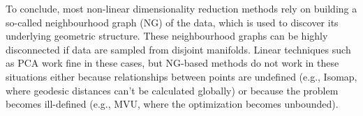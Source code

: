 
    


    To conclude, most non-linear dimensionality reduction methods rely on building a so-called neighbourhood graph (NG) of the data, which is used to discover its underlying geometric structure. These neighbourhood graphs can be highly disconnected if data are sampled from disjoint manifolds. Linear techniques such as PCA work fine in these cases, but NG-based methods do not work in these situations either because relationships between points are undefined (e.g., Isomap, where geodesic distances can't be calculated globally) or because the problem becomes ill-defined (e.g., MVU, where the optimization becomes unbounded).
